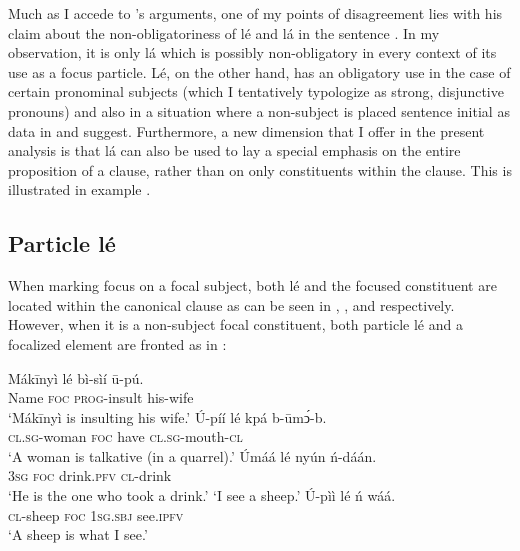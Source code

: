 \documentclass[output=paper,colorlinks,citecolor=brown]{langscibook}
\begin{document}
Much as I accede to \citeauthor{Schwarz2009}’s arguments, one of my points of disagreement lies with his claim about the non-obligatoriness of lé and lá in the sentence \citep[184-185]{Schwarz2009}. In my observation, it is only lá which is possibly non-obligatory in every context of its use as a focus particle. Lé, on the other hand, has an obligatory use in the case of certain pronominal subjects (which I tentatively typologize as strong, disjunctive pronouns) and also in a situation where a non-subject is placed sentence initial as data in  and  suggest. Furthermore, a new dimension that I offer in the present analysis is that lá can also be used to lay a special emphasis on the entire proposition of a clause, rather than on only constituents within the clause. This is illustrated in example .

\subsection{Particle lé}\label{sec:bisilki:7.1}

When marking focus on a focal subject, both lé and the focused constituent are located within the canonical clause as can be seen in , , and  respectively. However, when it is a non-subject focal constituent, both particle lé and a focalized element are fronted as in :

\ea%
    \label{ex:bisilki:22}
    \ea\label{ex:bisilki:22a}
    \gll    Mákīnyì	lé	bì-sìí	ū-pú.\\
            Name	\textsc{foc}	\textsc{prog-}insult		his-wife\\
    \glt    ‘Mákīnyì is insulting his wife.’
    \ex\label{ex:bisilki:22b}
    \gll    Ú-píí			lé	kpá	b-ūmͻ́-b.\\
            \textsc{cl.sg-}woman	\textsc{foc}	have	\textsc{cl.sg-}mouth\textsc{-cl}\\
    \glt    ‘A woman is talkative (in a quarrel).’
    \ex\label{ex:bisilki:22c}
    \gll    Úmáá		lé	nyún		ń-dáán.\\
            \textsc{3sg}		\textsc{foc}	drink\textsc{.pfv}	\textsc{cl-}drink\\
    \glt    ‘He is the one who took a drink.’
    \glt    ‘I see a sheep.’
    \ex\label{ex:bisilki:22e}
    \gll    Ú-pìì		lé	ń		wáá.\\
            \textsc{cl-}sheep	\textsc{foc}	\textsc{1sg.sbj}	see\textsc{.ipfv}\\
    \glt    ‘A sheep is what I see.’
    \z
\z
\end{document}
